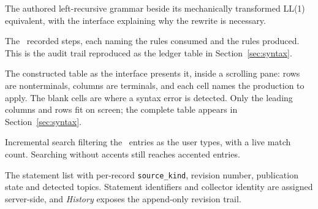 {The authored left-recursive grammar beside its mechanically transformed LL(1) equivalent,
with the interface explaining why the rewrite is necessary.}

{The \LedgerSteps\ recorded steps, each naming the rules consumed and the rules produced.
This is the audit trail reproduced as the ledger table in Section~\ref{sec:syntax}.}

{The constructed table as the interface presents it, inside a scrolling pane: rows are
nonterminals, columns are terminals, and each cell names the production to apply. The blank
cells are where a syntax error is detected. Only the leading columns and rows fit on screen;
the complete table appears in Section~\ref{sec:syntax}.}

{Incremental search filtering the \LexiconTotal\ entries as the user types, with a live
match count. Searching without accents still reaches accented entries.}

{The statement list with per-record \texttt{source\_kind}, revision number, publication state
and detected topics. Statement identifiers and collector identity are assigned server-side,
and \emph{History} exposes the append-only revision trail.}
